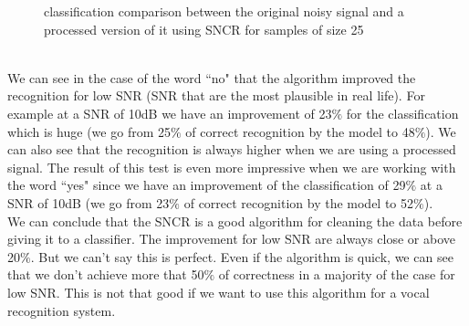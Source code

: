 \documentclass[11pt,a4paper,titlepage]{report}
\begin{document}
\begin{figure}[h!]
	\caption{classification comparison between the original noisy signal and a processed version of it using SNCR for samples of size 25}
	\label{fig:rapport12}
\end{figure}\\
We can see in the case of the word ``no" that the algorithm improved the recognition for low SNR (SNR that are the most plausible in real life). For example at a SNR of 10dB we have an improvement of 23$\%$ for the classification which is huge (we go from 25$\%$ of correct recognition by the model to 48$\%$). We can also see that the recognition is always higher when we are using a processed signal.
The result of this test is even more impressive when we are working with the word ``yes" since we have an improvement of the classification of 29$\%$ at a SNR of 10dB (we go from 23$\%$ of correct recognition by the model to 52$\%$).\\
We can conclude that the SNCR is a good algorithm for cleaning the data before giving it to a classifier. The improvement for low SNR are always close or above 20$\%$. But we can't say this is perfect. Even if the algorithm is quick, we can see that we don't achieve more that 50$\%$ of correctness in a majority of the case  for low SNR. This is not that good if we want  to use this algorithm for a vocal recognition system.
\end{document}
